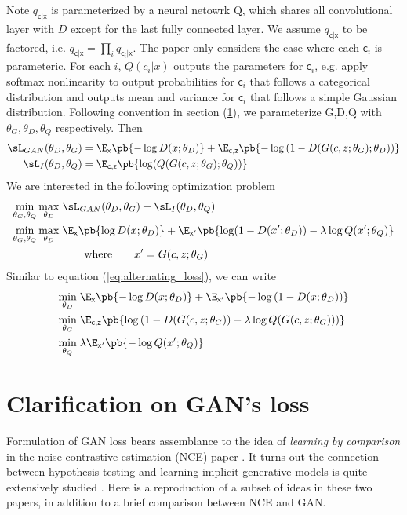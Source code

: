 \documentclass[11pt]{article}
\newcommand\rx{\ensuremath{\mathsf{x}}}
\newcommand\rc{\ensuremath{\mathsf{c}}}
\newcommand\rz{\ensuremath{\mathsf{z}}}
\begin{document}
Note $q_{\rc|\rx}$ is parameterized by a neural netowrk Q, which shares all convolutional layer with $D$ except for the last fully connected layer. We assume $q_{\rc|\rx}$ to be factored, i.e. $q_{\rc|\rx} = \prod_i q_{\rc_i|\rx}$. The paper only considers the case where each $\rc_i$ is parameteric. For each $i$, $Q(c_i|x)$ outputs the parameters for $\rc_i$, e.g. apply softmax nonlinearity to output probabilities for $\rc_i$ that follows a categorical distribution and outputs mean and variance for $\rc_i$ that follows a simple Gaussian distribution. Following convention in section (\ref{sec:gan_loss}), we parameterize G,D,Q with $\theta_G,\theta_D,\theta_Q$ respectively. Then
\begin{align*}
    \sL_{GAN}(\theta_D,\theta_G) 
        &= \E_{\rx}\pb{ -\log D(x;\theta_D) } +  \E_{\rc,\rz}\pb{ -\log \left( 1- D(G(c,z;\theta_G);\theta_D) \right) }    \\
    \sL_{I}(\theta_D,\theta_Q)
        &= \E_{\rc,\rz}\pb{ \log(Q(G(c,z;\theta_G);\theta_Q)) } 
\end{align*}
We are interested in the following optimization problem
\begin{align*}
    \min_{\theta_G,\theta_Q} \max_{\theta_D} \;
        &\sL_{GAN}(\theta_D,\theta_G) + \sL_{I}(\theta_D,\theta_Q) \\
    \min_{\theta_G,\theta_Q} \max_{\theta_D} \;
        &\E_{\rx}\pb{\log D(x;\theta_D)} + \E_{\rx'} \pb{ \log (1-D(x';\theta_D))- \lambda \log Q(x';\theta_Q) }\\
        &\quad\quad\text{where}\quad\quad x' = G(c,z;\theta_G)
\end{align*}
Similar to equation (\ref{eq:alternating_loss}), we can write
\begin{align*}
    \min_{\theta_D} \;
        &\E_{\rx}\pb{ -\log D(x;\theta_D) } + \E_{\rx'}\pb{ -\log \left( 1- D(x;\theta_D) \right) }  \\
    \min_{\theta_G} \;
        &\E_{\rc,\rz}\pb{ \log \left( 1- D(G(c,z;\theta_G)) - \lambda \log Q(G(c,z;\theta_G))  \right)  } \\
    \min_{\theta_Q} \;
        &\lambda \E_{\rx'}\pb{ -\log Q(x';\theta_Q) }
\end{align*}


\newpage
\section{Clarification on GAN's loss} \label{sec:gan_loss}

Formulation of GAN loss bears assemblance to the idea of \textit{learning by comparison} in the noise contrastive estimation (NCE) paper \cite{gutmannNoisecontrastiveEstimationNew2010}. It turns out the connection between hypothesis testing and learning implicit generative models is quite extensively studied \cite{mohamedLearningImplicitGenerative2017}. Here is a reproduction of a subset of ideas in these two papers, in addition to a brief comparison between NCE and GAN. 
\end{document}
